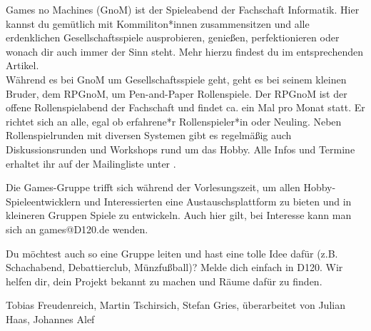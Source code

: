 {    Games no Machines (GnoM) ist der Spieleabend der Fachschaft Informatik. Hier kannst du gemütlich mit Kommiliton*innen zusammensitzen und alle erdenklichen Gesellschaftsspiele ausprobieren, genießen, perfektionieren oder wonach dir auch immer der Sinn steht. Mehr hierzu findest du im entsprechenden Artikel.\\
    Während es bei GnoM um Gesellschaftsspiele geht, geht es bei seinem kleinen Bruder, dem RPGnoM, um Pen-and-Paper Rollenspiele.
    Der RPGnoM ist der offene Rollenspielabend der Fachschaft und findet ca. ein Mal pro Monat statt. Er richtet sich an alle, egal ob erfahrene*r Rollenspieler*in oder Neuling. Neben Rollenspielrunden mit diversen Systemen gibt es regelmäßig auch Diskussionsrunden und Workshops rund um das Hobby. Alle Infos und Termine erhaltet ihr auf der Mailingliste unter \footnotemark[12].

    Die Games-Gruppe trifft sich während der Vorlesungszeit, um allen Hobby-Spiele\-ent\-wicklern und Interessierten eine Austauschsplattform zu bieten und in kleineren Gruppen Spiele zu entwickeln. Auch hier gilt, bei Interesse kann man sich an \mbox{games@D120.de} wenden.

    Du möchtest auch so eine Gruppe leiten und hast eine tolle Idee dafür (z.B. Schachabend, Debattierclub, Münzfußball)? Melde dich einfach in D120. Wir helfen dir, dein Projekt bekannt zu machen und Räume dafür zu finden.
}
{Tobias Freudenreich, Martin Tschirsich, Stefan Gries,
    überarbeitet von Julian Haas, Johannes Alef}


\newpage
